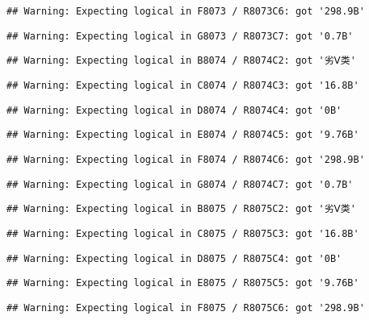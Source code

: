 \documentclass[
]{article}
\begin{document}
\begin{verbatim}
## Warning: Expecting logical in F8073 / R8073C6: got '298.9B'
\end{verbatim}

\begin{verbatim}
## Warning: Expecting logical in G8073 / R8073C7: got '0.7B'
\end{verbatim}

\begin{verbatim}
## Warning: Expecting logical in B8074 / R8074C2: got '劣Ⅴ类'
\end{verbatim}

\begin{verbatim}
## Warning: Expecting logical in C8074 / R8074C3: got '16.8B'
\end{verbatim}

\begin{verbatim}
## Warning: Expecting logical in D8074 / R8074C4: got '0B'
\end{verbatim}

\begin{verbatim}
## Warning: Expecting logical in E8074 / R8074C5: got '9.76B'
\end{verbatim}

\begin{verbatim}
## Warning: Expecting logical in F8074 / R8074C6: got '298.9B'
\end{verbatim}

\begin{verbatim}
## Warning: Expecting logical in G8074 / R8074C7: got '0.7B'
\end{verbatim}

\begin{verbatim}
## Warning: Expecting logical in B8075 / R8075C2: got '劣Ⅴ类'
\end{verbatim}

\begin{verbatim}
## Warning: Expecting logical in C8075 / R8075C3: got '16.8B'
\end{verbatim}

\begin{verbatim}
## Warning: Expecting logical in D8075 / R8075C4: got '0B'
\end{verbatim}

\begin{verbatim}
## Warning: Expecting logical in E8075 / R8075C5: got '9.76B'
\end{verbatim}

\begin{verbatim}
## Warning: Expecting logical in F8075 / R8075C6: got '298.9B'
\end{verbatim}
\end{document}
